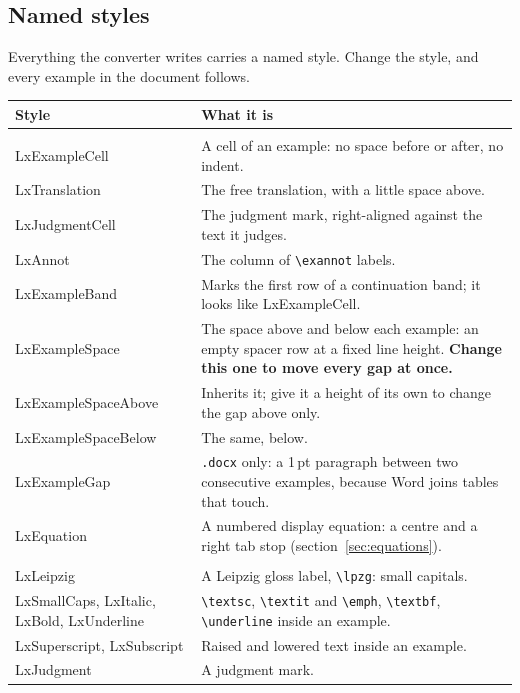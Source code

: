 \documentclass[11pt,a4paper]{article}
\newcommand{\cs}[1]{\texttt{\textbackslash #1}}
\newcommand{\file}[1]{\texttt{#1}}
\newcommand{\sty}[1]{\textsf{#1}}
\begin{document}
\subsection{Named styles}\label{sec:styles}

Everything the converter writes carries a named style. Change the style, and
every example in the document follows.

\begin{longtable}{@{}>{\sffamily\raggedright\arraybackslash}p{4.2cm} p{9.6cm}@{}}
\toprule
\normalfont\textbf{Style} & \textbf{What it is}\\
\midrule
\endhead
\multicolumn{2}{@{}l}{\emph{Paragraph styles}}\\[2pt]
LxExampleCell & A cell of an example: no space before or after, no indent.\\
LxTranslation & The free translation, with a little space above.\\
LxJudgmentCell & The judgment mark, right-aligned against the text it judges.\\
LxAnnot & The column of \cs{exannot} labels.\\
LxExampleBand & Marks the first row of a continuation band; it looks like
  \sty{LxExampleCell}.\\
LxExampleSpace & The space above and below each example: an empty spacer
  row at a fixed line height. \textbf{Change this one to move every gap at once.}\\
LxExampleSpaceAbove & Inherits it; give it a height of its own to change the gap above only.\\
LxExampleSpaceBelow & The same, below.\\
LxExampleGap & \file{.docx} only: a 1\,pt paragraph between two consecutive
  examples, because Word joins tables that touch.\\
LxEquation & A numbered display equation: a centre and a right tab stop
  (section~\ref{sec:equations}).\\[4pt]
\multicolumn{2}{@{}l}{\emph{Character styles}}\\[2pt]
LxLeipzig & A Leipzig gloss label, \cs{lpzg}: small capitals.\\
LxSmallCaps, LxItalic, LxBold, LxUnderline & \cs{textsc}, \cs{textit} and
  \cs{emph}, \cs{textbf}, \cs{underline} inside an example.\\
LxSuperscript, LxSubscript & Raised and lowered text inside an example.\\
LxJudgment & A judgment mark.\\
\bottomrule
\end{longtable}
\end{document}
